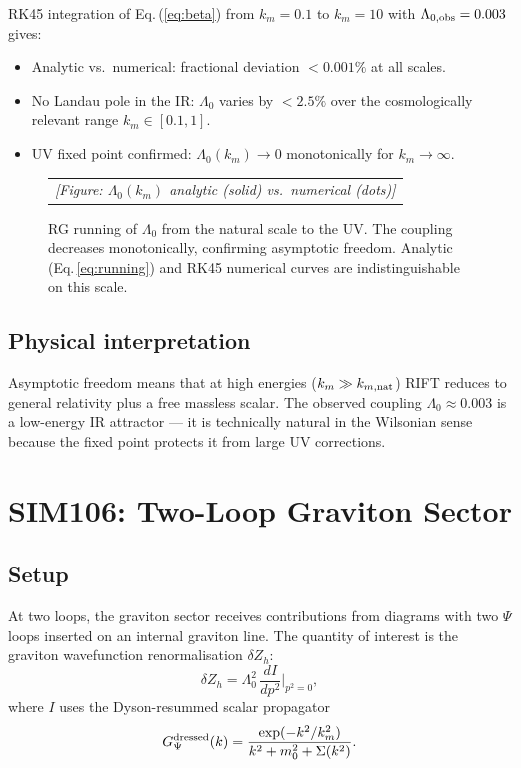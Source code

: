 \documentclass[12pt,a4paper]{article}
\begin{document}
RK45 integration of Eq.\,(\ref{eq:beta}) from $k_m=0.1$ to $k_m=10$
with $\Lambda_{0,\rm obs}=0.003$ gives:
\begin{itemize}
  \item Analytic vs.\ numerical: fractional deviation $<0.001\%$ at
        all scales.
  \item No Landau pole in the IR: $\Lambda_0$ varies by $<2.5\%$ over
        the cosmologically relevant range $k_m\in[0.1,1]$.
  \item UV fixed point confirmed: $\Lambda_0(k_m)\to0$ monotonically
        for $k_m\to\infty$.
\end{itemize}

\begin{figure}[H]
\centering
\begin{tabular}{c}
\textit{[Figure: $\Lambda_0(k_m)$ analytic (solid) vs.\ numerical (dots)]}
\end{tabular}
\caption{RG running of $\Lambda_0$ from the natural scale to the UV.
The coupling decreases monotonically, confirming asymptotic freedom.
Analytic (Eq.\,\ref{eq:running}) and RK45 numerical curves are
indistinguishable on this scale.}
\label{fig:rg_running}
\end{figure}

\subsection{Physical interpretation}

Asymptotic freedom means that at high energies ($k_m\gg k_{m,\rm nat}$)
RIFT reduces to general relativity plus a free massless scalar.  The
observed coupling $\Lambda_0\approx0.003$ is a low-energy IR attractor —
it is technically natural in the Wilsonian sense because the fixed point
protects it from large UV corrections.

\section{SIM106: Two-Loop Graviton Sector}
\label{sec:sim106}

\subsection{Setup}

At two loops, the graviton sector receives contributions from diagrams
with two $\Psi$ loops inserted on an internal graviton line.  The
quantity of interest is the graviton wavefunction renormalisation
$\delta Z_h$:
\begin{equation}
\delta Z_h = \Lambda_0^2\,\frac{dI}{dp^2}\bigg|_{p^2=0},
\end{equation}
where $I$ uses the Dyson-resummed scalar propagator
\begin{equation}
G_\Psi^{\rm dressed}(k) = \frac{\exp(-k^2/k_m^2)}{k^2 + m_0^2 + \Sigma(k^2)}.
\end{equation}
\end{document}

